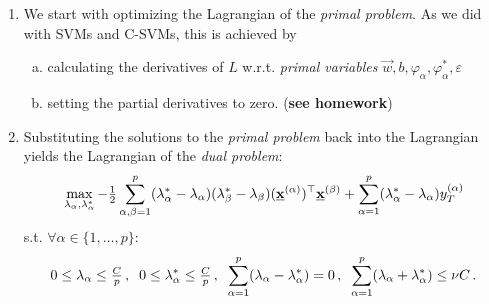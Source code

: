 \begin{frame}\frametitle{\subsecname}

\begin{enumerate}
\item We start with optimizing the Lagrangian of the \emph{primal problem}. As we did with SVMs and C-SVMs, this is achieved by
\begin{enumerate}[(a)]
\item calculating the derivatives of $L$ w.r.t. \emph{primal variables} $\vec w, b, \varphi_\alpha, \varphi_\alpha^*, \varepsilon$
\item setting the partial derivatives to zero. (\textbf{see homework})
\end{enumerate}

\item Substituting the solutions to the \emph{primal problem} back into the Lagrangian yields the Lagrangian of the \emph{dual problem}:
		\begin{equation}
		  \max_{\lambda_{\alpha}, \lambda_{\alpha}^*}
		  - {\textstyle \frac{1}{2}}\sum_{\alpha,\beta=1}^p(\lambda_{\alpha}^* -
		  \lambda_{\alpha}) (\lambda_{\beta}^* - \lambda_{\beta})
		  (\underline{\mathbf{x}}^{(\alpha)})^\top\underline{\mathbf{x}}^{(\beta)} +
		  \sum_{\alpha=1}^p(\lambda_{\alpha}^* 
		  - \lambda_{\alpha})y_T^{(\alpha)}
		  \nonumber
		\end{equation}
		s.t. $\forall \alpha \in \{1,\ldots,p\}$:
		$$
		  0 \leq \lambda_{\alpha} \leq {\textstyle \frac{C}{p}}
		  \,, \;\;
		  0 \leq \lambda_{\alpha}^* \leq {\textstyle \frac{C}{p}}
		  \,, \;\;
		  \sum_{\alpha=1}^p(\lambda_{\alpha} - \lambda_{\alpha}^*) = 0 
		  \,, \;\;
		  \sum_{\alpha=1}^p(\lambda_{\alpha} + \lambda_{\alpha}^*) 
		  \leq  \nu C \,.  \nonumber
		$$
\end{enumerate}


\end{frame}



